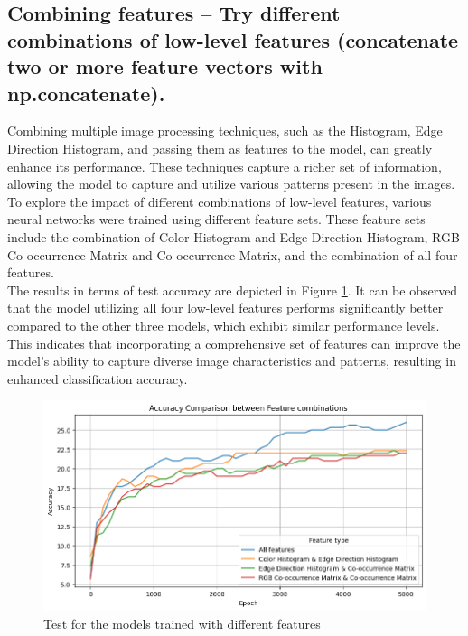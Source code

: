 \documentclass{class}
\begin{document}
\subsection{Combining features -- Try different combinations of low-level features (concatenate two or more feature vectors
    with np.concatenate).}
Combining multiple image processing techniques, such as the Histogram, Edge Direction Histogram, and passing them as features to the model,
can greatly enhance its performance. These techniques capture a richer set of information,
allowing the model to capture and utilize various patterns present in the images.\\
To explore the impact of different combinations of low-level features, various neural networks were trained using different feature sets.
These feature sets include the combination of Color Histogram and Edge Direction Histogram, RGB Co-occurrence Matrix and Co-occurrence Matrix,
and the combination of all four features.\\
The results in terms of test accuracy are depicted in Figure \ref{fig-3}.
It can be observed that the model utilizing all four low-level features performs significantly better compared to the other three models,
which exhibit similar performance levels.\\
This indicates that incorporating a comprehensive set of features can improve the model's ability to capture diverse image characteristics and patterns,
resulting in enhanced classification accuracy.
\begin{figure}[h]
    \centering
    \includegraphics[width=\columnwidth]{images/2.1_diff_features.png}
    \caption{Test for the models trained with different features}
    \label{fig-3}
\end{figure}
\end{document}
